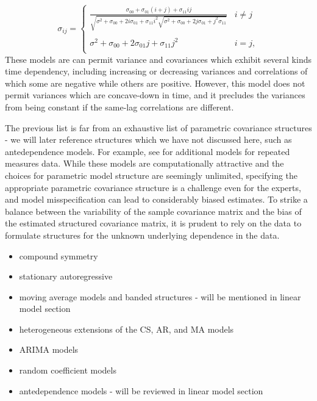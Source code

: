 \begin{equation}
\sigma_{ij} = \left\{ \begin{array}{ll}
\frac{\sigma_{00} + \sigma_{01}\left(i + j\right) + \sigma_{11} ij}{\sqrt{\sigma^2 + \sigma_{00} + 2i\sigma_{01} + \sigma_{11}i^2\sqrt{\sigma^2 + \sigma_{00} + 2j\sigma_{01} +j^2\sigma_{11}} }} &  i \ne j \\ 
& \\
\sigma^2 + \sigma_{00} + 2\sigma_{01}j + \sigma_{11}j^2 &  i= j, \\
\end{array}\right.
\end{equation}
\noindent
These models are can permit variance and covariances which exhibit several kinds time dependency, including increasing or decreasing variances and correlations of which some are negative while others are positive. However, this model does not permit variances which are concave-down in time, and it precludes the variances from being constant if the same-lag correlations are different.

\bigskip

The previous list is far from an exhaustive list of parametric covariance structures - we will later reference structures which we have not discussed here, such as antedependence models. For example, see \citet{jennrich1986unbalanced} for additional models for repeated measures data. While these models are computationally attractive and the choices for parametric model structure are seemingly unlimited, specifying the appropriate parametric covariance structure is a challenge even for the experts, and model misspecification can lead to considerably biased estimates. To strike a balance between the variability of the sample covariance matrix and the bias of the estimated structured covariance matrix, it is prudent to rely on the data to formulate structures for the unknown underlying dependence in the data.


\begin{itemize}
\item compound symmetry
\item stationary autoregressive
\item moving average models and banded structures - will be mentioned in linear model section
\item heterogeneous extensions of the CS, AR, and MA models
\item ARIMA models
\item random coefficient models
\item antedependence models - will be reviewed in linear model section
\end{itemize}
